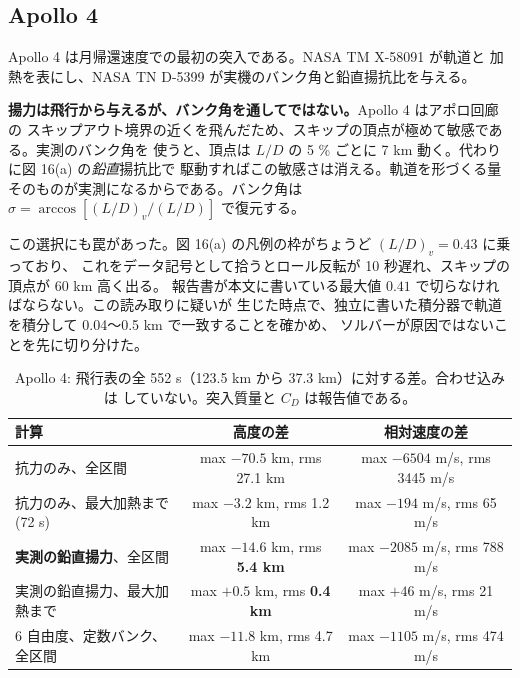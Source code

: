 \documentclass[11pt,a4paper,dvipdfmx]{jsarticle}
\begin{document}
\subsection{Apollo 4}

Apollo 4 は月帰還速度での最初の突入である。NASA TM X-58091 \cite{Ried1972} が軌道と
加熱を表にし、NASA TN D-5399 \cite{Hillje1969} が実機のバンク角と鉛直揚抗比を与える。

\textbf{揚力は飛行から与えるが、バンク角を通してではない。}Apollo 4 はアポロ回廊の
スキップアウト境界の近くを飛んだため、スキップの頂点が極めて敏感である。実測のバンク角を
使うと、頂点は $L/D$ の 5 \% ごとに 7 km 動く。代わりに図 16(a) の\emph{鉛直}揚抗比で
駆動すればこの敏感さは消える。軌道を形づくる量そのものが実測になるからである。バンク角は
$\sigma = \arccos\left[ (L/D)_v / (L/D) \right]$ で復元する。

この選択にも罠があった。図 16(a) の凡例の枠がちょうど $(L/D)_v = 0.43$ に乗っており、
これをデータ記号として拾うとロール反転が 10 秒遅れ、スキップの頂点が 60 km 高く出る。
報告書が本文に書いている最大値 $0.41$ で切らなければならない。この読み取りに疑いが
生じた時点で、独立に書いた積分器で軌道を積分して 0.04〜0.5 km で一致することを確かめ、
ソルバーが原因ではないことを先に切り分けた。

\begin{table}[h]
\caption{Apollo 4: 飛行表の全 552 s（123.5 km から 37.3 km）に対する差。合わせ込みは
していない。突入質量と $C_D$ は報告値である。}
\label{apollo4_results}
\begin{center}
\footnotesize
\begin{tabular}{l|c|c}
\hline \hline
計算 & 高度の差 & 相対速度の差 \\
\hline
抗力のみ、全区間 & max $-70.5$ km, rms 27.1 km & max $-6504$ m/s, rms 3445 m/s \\
抗力のみ、最大加熱まで (72 s) & max $-3.2$ km, rms 1.2 km & max $-194$ m/s, rms 65 m/s \\
\textbf{実測の鉛直揚力}、全区間 & max $-14.6$ km, rms \textbf{5.4 km} & max $-2085$ m/s, rms 788 m/s \\
実測の鉛直揚力、最大加熱まで & max $+0.5$ km, rms \textbf{0.4 km} & max $+46$ m/s, rms 21 m/s \\
6 自由度、定数バンク、全区間 & max $-11.8$ km, rms 4.7 km & max $-1105$ m/s, rms 474 m/s \\
\hline \hline
\end{tabular}
\end{center}
\end{table}
\end{document}
